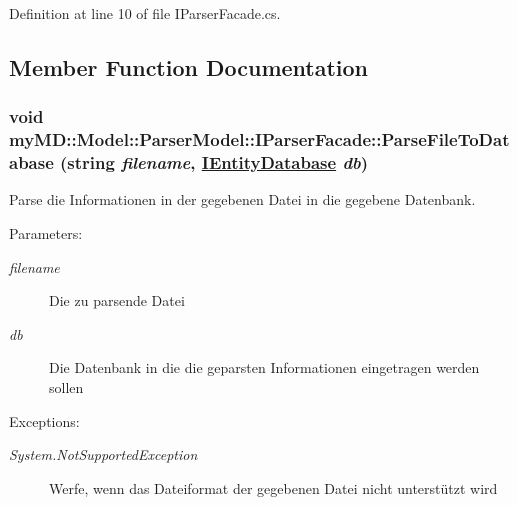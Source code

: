 Definition at line 10 of file IParser\-Facade.cs.

\subsection{Member Function Documentation}
\hypertarget{interfacemy_m_d_1_1_model_1_1_parser_model_1_1_i_parser_facade_6ffe5b6c5af78ec3e9cdb29a04560a9f}{
\subsubsection[ParseFileToDatabase]{\setlength{\rightskip}{0pt plus 5cm}void my\-MD::Model::Parser\-Model::IParser\-Facade::Parse\-File\-To\-Database (string {\em filename}, \hyperlink{interfacemy_m_d_1_1_model_1_1_database_model_1_1_i_entity_database}{IEntity\-Database} {\em db})}}
\label{d6/d07/interfacemy_m_d_1_1_model_1_1_parser_model_1_1_i_parser_facade_6ffe5b6c5af78ec3e9cdb29a04560a9f}


Parse die Informationen in der gegebenen Datei in die gegebene Datenbank. 

\begin{Desc}
\item[Parameters:]
\begin{description}
\item[{\em filename}]Die zu parsende Datei\item[{\em db}]Die Datenbank in die die geparsten Informationen eingetragen werden sollen\end{description}
\end{Desc}
\begin{Desc}
\item[Exceptions:]
\begin{description}
\item[{\em System.Not\-Supported\-Exception}]Werfe, wenn das Dateiformat der gegebenen Datei nicht unterst\"{u}tzt wird\end{description}
\end{Desc}


